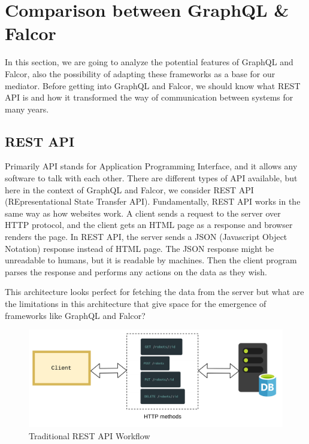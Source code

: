 

    \chapter{Comparison between GraphQL \& Falcor}
	In this section, we are going to analyze the potential features of GraphQL and Falcor, also the possibility of adapting these frameworks as a base for our mediator. Before getting into GraphQL and Falcor, we should know what REST API is and how it transformed the way of communication between systems for many years.
    \section{REST API}
	Primarily API stands for Application Programming Interface, and it allows any software to talk with each other. There are different types of API available, but here in the context of GraphQL and Falcor, we consider REST API (REpresentational State Transfer API).  Fundamentally, REST API works in the same way as how websites work. A client sends a request to the server over HTTP protocol, and the client gets an HTML page as a response and browser renders the page. In REST API, the server sends a JSON (Javascript Object Notation) response instead of HTML page. The JSON response might be unreadable to humans, but it is readable by machines. Then the client program parses the response and performs any actions on the data as they wish. 

	This architecture looks perfect for fetching the data from the server but what are the limitations in this architecture that give space for the emergence of frameworks like GraphQL and Falcor?
	
	\begin{figure}[!htbp] 
		\begin{center}
			\includegraphics[trim={0 0 0 2cm},clip,scale=0.105]{./images/png/rest_workflow}	
			\caption{Traditional REST API Workflow}	
			\label{fig:rest_workflow}	
		\end{center}
	\end{figure}
	
